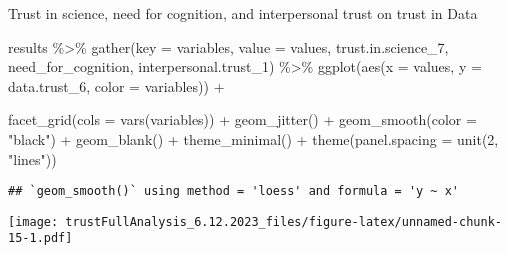 \documentclass[
]{article}
\newenvironment{Shaded}{\begin{snugshade}}{\end{snugshade}}
\newcommand{\AttributeTok}[1]{\textcolor[rgb]{0.77,0.63,0.00}{#1}}
\newcommand{\DecValTok}[1]{\textcolor[rgb]{0.00,0.00,0.81}{#1}}
\newcommand{\FunctionTok}[1]{\textcolor[rgb]{0.00,0.00,0.00}{#1}}
\newcommand{\NormalTok}[1]{#1}
\newcommand{\SpecialCharTok}[1]{\textcolor[rgb]{0.00,0.00,0.00}{#1}}
\newcommand{\StringTok}[1]{\textcolor[rgb]{0.31,0.60,0.02}{#1}}
\begin{document}
Trust in science, need for cognition, and interpersonal trust on trust
in Data

\begin{Shaded}
\begin{Highlighting}[]
\NormalTok{results }\SpecialCharTok{\%\textgreater{}\%}
  \FunctionTok{gather}\NormalTok{(}\AttributeTok{key =}\NormalTok{ variables, }\AttributeTok{value =}\NormalTok{ values, }
\NormalTok{         trust.in.science\_7, need\_for\_cognition, interpersonal.trust\_1) }\SpecialCharTok{\%\textgreater{}\%}
  \FunctionTok{ggplot}\NormalTok{(}\FunctionTok{aes}\NormalTok{(}\AttributeTok{x =}\NormalTok{ values, }\AttributeTok{y =}\NormalTok{ data.trust\_6, }\AttributeTok{color =}\NormalTok{ variables)) }\SpecialCharTok{+}

  \FunctionTok{facet\_grid}\NormalTok{(}\AttributeTok{cols =} \FunctionTok{vars}\NormalTok{(variables)) }\SpecialCharTok{+}
    \FunctionTok{geom\_jitter}\NormalTok{() }\SpecialCharTok{+}
  \FunctionTok{geom\_smooth}\NormalTok{(}\AttributeTok{color =} \StringTok{"black"}\NormalTok{) }\SpecialCharTok{+}
  \FunctionTok{geom\_blank}\NormalTok{() }\SpecialCharTok{+} 
   \FunctionTok{theme\_minimal}\NormalTok{() }\SpecialCharTok{+}
  \FunctionTok{theme}\NormalTok{(}\AttributeTok{panel.spacing =} \FunctionTok{unit}\NormalTok{(}\DecValTok{2}\NormalTok{, }\StringTok{"lines"}\NormalTok{))}
\end{Highlighting}
\end{Shaded}

\begin{verbatim}
## `geom_smooth()` using method = 'loess' and formula = 'y ~ x'
\end{verbatim}

\texttt{[image: trustFullAnalysis\_6.12.2023\_files/figure-latex/unnamed-chunk-15-1.pdf]}
\end{document}
